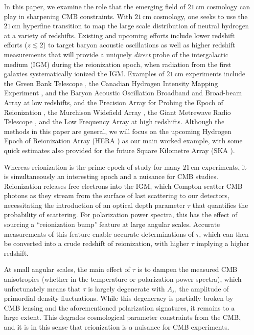 \documentclass[twocolumn,aps,prd,nofootinbib,showpacs]{revtex4-1}
\begin{document}
In this paper, we examine the role that the emerging field of $21\,\textrm{cm}$ cosmology can play in sharpening CMB constraints. With $21\,\textrm{cm}$ cosmology, one seeks to use the $21\,\textrm{cm}$ hyperfine transition to map the large scale distribution of neutral hydrogen at a variety of redshifts. Existing and upcoming efforts include lower redshift efforts ($z \lesssim 2$) to target baryon acoustic oscillations as well as higher redshift measurements that will provide a uniquely \emph{direct} probe of the intergalactic medium (IGM) during the reionization epoch, when radiation from the first galaxies systematically ionized the IGM. Examples of $21\,\textrm{cm}$ experiments include the Green Bank Telescope \cite{masui_et_al2013,switzer_et_al2013}, the Canadian Hydrogen Intensity Mapping Experiment \cite{shaw_et_al2014a}, and the Baryon Acoustic Oscillation Broadband and Broad-beam Array \cite{pober_et_al2013} at low redshifts, and the Precision Array for Probing the Epoch of Reionization \cite{parsons_et_al2010}, the Murchison Widefield Array \cite{tingay_et_al2013,bowman_et_al2012}, the Giant Metrewave Radio Telescope \cite{paciga_et_al2013}, and the Low Frequency Array \cite{van_haarlem_et_al2013} at high redshifts. Although the methods in this paper are general, we will focus on the upcoming Hydrogen Epoch of Reionization Array (HERA \cite{pober_et_al2014}) as our main worked example, with some quick estimates also provided for the future Square Kilometre Array (SKA \cite{mellema_et_al2013}).

Whereas reionization is the prime epoch of study for many $21\,\textrm{cm}$ experiments, it is simultaneously an interesting epoch and a nuisance for CMB studies. Reionization releases free electrons into the IGM, which Compton scatter CMB photons as they stream from the surface of last scattering to our detectors, necessitating the introduction of an optical depth parameter $\tau$ that quantifies the probability of scattering. For polarization power spectra, this has the effect of sourcing a ``reionization bump" feature at large angular scales. Accurate measurements of this feature enable accurate determinations of $\tau$, which can then be converted into a crude redshift of reionization, with higher $\tau$ implying a higher redshift.

At small angular scales, the main effect of $\tau$ is to dampen the measured CMB anisotropies (whether in the temperature or polarization power spectra), which unfortunately means that $\tau$ is largely degenerate with $A_s$, the amplitude of primordial density fluctuations. While this degeneracy is partially broken by CMB lensing and the aforementioned polarization signatures, it remains to a large extent. This degrades cosmological parameter constraints from the CMB, and it is in this sense that reionization is a nuisance for CMB experiments.
\end{document}
